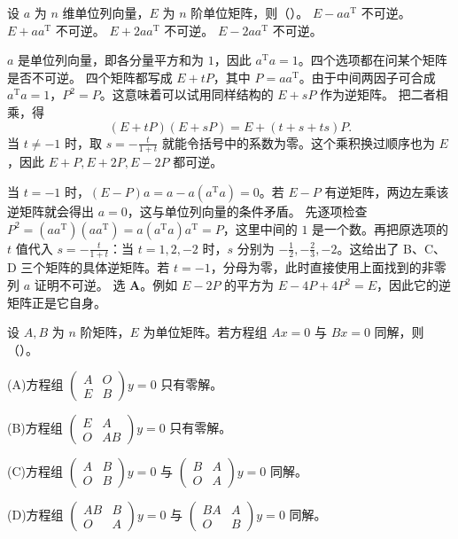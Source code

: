 \documentclass[UTF8,zihao=-4,fontset=fandol]{ctexart}
\begin{document}

设 $a$ 为 $n$ 维单位列向量，$E$ 为 $n$ 阶单位矩阵，则（\quad）。
\Choices
  {$E-aa^{\mathrm T}$ 不可逆。}
  {$E+aa^{\mathrm T}$ 不可逆。}
  {$E+2aa^{\mathrm T}$ 不可逆。}
  {$E-2aa^{\mathrm T}$ 不可逆。}

\Solution
\Known $a$ 是单位列向量，即各分量平方和为 $1$，因此 $a^{\mathrm T}a=1$。四个选项都在问某个矩阵是否不可逆。
\Method 四个矩阵都写成 $E+tP$，其中 $P=aa^{\mathrm T}$。由于中间两因子可合成 $a^{\mathrm T}a=1$，$P^2=P$。这意味着可以试用同样结构的 $E+sP$ 作为逆矩阵。
\Derive 把二者相乘，得
\[
(E+tP)(E+sP)=E+(t+s+ts)P.
\]
当 $t\ne-1$ 时，取 $s=-\frac{t}{1+t}$ 就能令括号中的系数为零。这个乘积换过顺序也为 $E$，因此 $E+P,E+2P,E-2P$ 都可逆。

当 $t=-1$ 时，$(E-P)a=a-a(a^{\mathrm T}a)=0$。若 $E-P$ 有逆矩阵，两边左乘该逆矩阵就会得出 $a=0$，这与单位列向量的条件矛盾。
先逐项检查 $P^2=(aa^{\mathrm T})(aa^{\mathrm T})=a(a^{\mathrm T}a)a^{\mathrm T}=P$，这里中间的 $1$ 是一个数。再把原选项的 $t$ 值代入 $s=-\frac{t}{1+t}$：当 $t=1,2,-2$ 时，$s$ 分别为 $-\frac{1}{2},-\frac{2}{3},-2$。这给出了 B、C、D 三个矩阵的具体逆矩阵。若 $t=-1$，分母为零，此时直接使用上面找到的非零列 $a$ 证明不可逆。
\Verify 选 \textbf{A}。例如 $E-2P$ 的平方为 $E-4P+4P^2=E$，因此它的逆矩阵正是它自身。

设 $A,B$ 为 $n$ 阶矩阵，$E$ 为单位矩阵。若方程组 $Ax=0$ 与 $Bx=0$ 同解，则（\quad）。

(A)\enspace 方程组 $\begin{pmatrix}A&O\\E&B\end{pmatrix}y=0$ 只有零解。

(B)\enspace 方程组 $\begin{pmatrix}E&A\\O&AB\end{pmatrix}y=0$ 只有零解。

(C)\enspace 方程组 $\begin{pmatrix}A&B\\O&B\end{pmatrix}y=0$ 与 $\begin{pmatrix}B&A\\O&A\end{pmatrix}y=0$ 同解。

(D)\enspace 方程组 $\begin{pmatrix}AB&B\\O&A\end{pmatrix}y=0$ 与 $\begin{pmatrix}BA&A\\O&B\end{pmatrix}y=0$ 同解。
\end{document}
